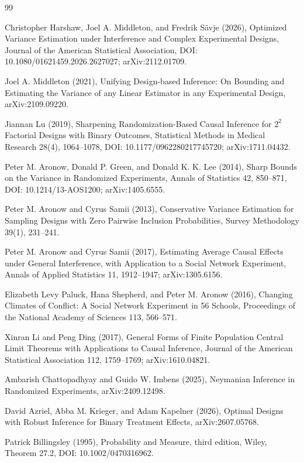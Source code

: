 \documentclass{article}
\begin{document}
\begin{thebibliography}{99}

   Christopher Harshaw, Joel A. Middleton, and Fredrik S\"avje (2026), Optimized Variance Estimation under Interference and Complex Experimental Designs, Journal of the American Statistical Association, DOI: 10.1080/01621459.2026.2627027; arXiv:2112.01709.

   Joel A. Middleton (2021), Unifying Design-based Inference: On Bounding and Estimating the Variance of any Linear Estimator in any Experimental Design, arXiv:2109.09220.

   Jiannan Lu (2019), Sharpening Randomization-Based Causal Inference for \(2^2\) Factorial Designs with Binary Outcomes, Statistical Methods in Medical Research 28(4), 1064--1078, DOI: 10.1177/0962280217745720; arXiv:1711.04432.

   Peter M. Aronow, Donald P. Green, and Donald K. K. Lee (2014), Sharp Bounds on the Variance in Randomized Experiments, Annals of Statistics 42, 850--871, DOI: 10.1214/13-AOS1200; arXiv:1405.6555.

   Peter M. Aronow and Cyrus Samii (2013), Conservative Variance Estimation for Sampling Designs with Zero Pairwise Inclusion Probabilities, Survey Methodology 39(1), 231--241.

   Peter M. Aronow and Cyrus Samii (2017), Estimating Average Causal Effects under General Interference, with Application to a Social Network Experiment, Annals of Applied Statistics 11, 1912--1947; arXiv:1305.6156.

   Elizabeth Levy Paluck, Hana Shepherd, and Peter M. Aronow (2016), Changing Climates of Conflict: A Social Network Experiment in 56 Schools, Proceedings of the National Academy of Sciences 113, 566--571.

   Xinran Li and Peng Ding (2017), General Forms of Finite Population Central Limit Theorems with Applications to Causal Inference, Journal of the American Statistical Association 112, 1759--1769; arXiv:1610.04821.

   Ambarish Chattopadhyay and Guido W. Imbens (2025), Neymanian Inference in Randomized Experiments, arXiv:2409.12498.

   David Azriel, Abba M. Krieger, and Adam Kapelner (2026), Optimal Designs with Robust Inference for Binary Treatment Effects, arXiv:2607.05768.

   Patrick Billingsley (1995), Probability and Measure, third edition, Wiley, Theorem 27.2, DOI: 10.1002/0470316962.

\end{thebibliography}
\end{document}
